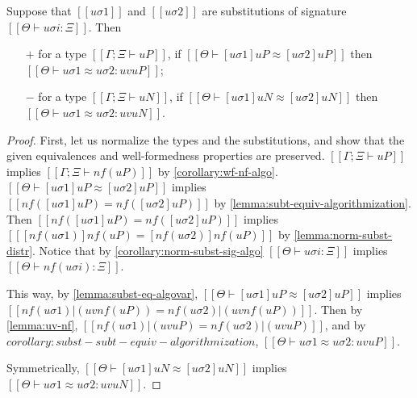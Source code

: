 \begin{corollary}
  \label{lemma:subst-equiv-algovar}
  Suppose that $[[uσ1]]$ and $[[uσ2]]$ are substitutions 
  of signature $[[Θ ⊢ uσi : Ξ]]$.
  Then 
  \begin{enumerate}
    \item [$+$] for a type $[[Γ; Ξ ⊢ uP]]$, if $[[Θ ⊢ [uσ1]uP ≈ [uσ2]uP]]$ then
      $[[Θ ⊢ uσ1 ≈ uσ2 : uv uP]]$;
    \item [$-$] for a type $[[Γ; Ξ ⊢ uN]]$, if $[[Θ ⊢ [uσ1]uN ≈ [uσ2]uN]]$ then
      $[[Θ ⊢ uσ1 ≈ uσ2 : uv uN]]$.
  \end{enumerate}
\end{corollary}
\begin{proof}
  First, let us normalize the types and the substitutions, and show that
  the given equivalences and well-formedness properties are preserved. 
  $[[Γ; Ξ ⊢ uP]]$ implies $[[Γ; Ξ ⊢ nf(uP)]]$ by \cref{corollary:wf-nf-algo}.
  $[[Θ ⊢ [uσ1]uP ≈ [uσ2]uP]]$ implies $[[ nf([uσ1]uP) = nf([uσ2]uP)]]$ by 
  \cref{lemma:subt-equiv-algorithmization}.
  Then $[[ nf([uσ1]uP) = nf([uσ2]uP)]]$ implies 
  $[[ [nf(uσ1)]nf(uP) = [nf(uσ2)]nf(uP)]]$ by \cref{lemma:norm-subst-distr}.
  Notice that by \cref{corollary:norm-subst-sig-algo}
  $[[Θ ⊢ uσi : Ξ]]$ implies $[[Θ ⊢ nf(uσi) : Ξ]]$.

  This way, by \cref{lemma:subst-eq-algovar}, 
  $[[Θ ⊢ [uσ1]uP ≈ [uσ2]uP]]$ implies 
  $[[nf(uσ1)|(uv nf(uP)) = nf(uσ2)|(uv nf(uP))]]$.
  Then by \cref{lemma:uv-nf}, 
  $[[nf(uσ1)|(uv uP) = nf(uσ2)|(uv uP)]]$,
  and by ${{corollary:subst-subt-equiv-algorithmization}}$,
  $[[Θ ⊢ uσ1 ≈ uσ2 : uv uP]]$.

  Symmetrically, 
  $[[Θ ⊢ [uσ1]uN ≈ [uσ2]uN]]$ implies 
  $[[Θ ⊢ uσ1 ≈ uσ2 : uv uN]]$.
\end{proof}
